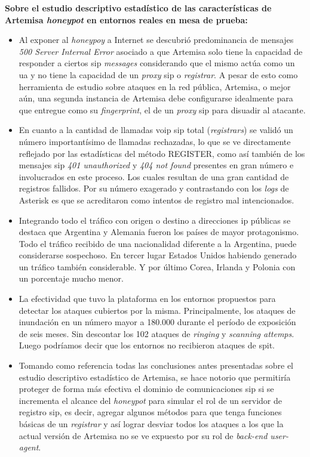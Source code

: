 \documentclass[a4paper,12pt]{report}
\begin{document}
\textbf{Sobre el estudio descriptivo estadístico de las características de Artemisa
\emph{honeypot} en entornos reales en mesa de prueba:}

\begin{itemize}
\item{Al exponer al \emph{honeypoy} a Internet se descubrió predominancia de mensajes 
\emph{500 Server Internal Error} asociado a que Artemisa solo tiene la capacidad de responder
a ciertos \ac{sip} \emph{messages} considerando que el mismo actúa como un \ac{ua} y no tiene la
capacidad de un \emph{proxy} \ac{sip} o \emph{registrar}. A pesar de esto como herramienta
de estudio sobre ataques en la red pública,  Artemisa, o mejor aún, una 
segunda instancia de Artemisa debe configurarse idealmente para que entregue como su \emph{fingerprint},
el de un \emph{proxy} \ac{sip} para disuadir al atacante.}

\item{En cuanto a la cantidad de llamadas \ac{voip} \ac{sip} total (\emph{registrars})
se validó un número importantísimo de llamadas rechazadas, lo que se ve directamente
reflejado por las estadísticas del método REGISTER, como así también de los mensajes \ac{sip}
\emph{401 unauthorized} y \emph{404 not found} presentes en gran número e involucrados en este proceso. 
Los cuales resultan de una gran cantidad de registros fallidos. Por su número exagerado y \mbox{contrastando}
con los \emph{logs} de Asterisk es que se acreditaron como intentos de
registro mal intencionados.}

\item{Integrando todo el tráfico con origen o destino a direcciones \ac{ip} públicas
se destaca que Argentina y Alemania fueron los países de mayor protagonismo. 
Todo el tráfico recibido de una nacionalidad diferente a la Argentina, puede considerarse sospechoso.
En tercer lugar Estados Unidos habiendo generado un tráfico también
considerable. Y por último Corea, Irlanda y Polonia con un porcentaje mucho
menor.}

\item{La efectividad que tuvo la plataforma en los entornos propuestos 
para detectar los ataques cubiertos por la misma. Principalmente, los ataques de inundación 
en un número mayor a 180.000 durante el período de exposición de seis meses. Sin descontar 
los 102 ataques de \emph{ringing} y \emph{scanning attemps}. Luego podríamos decir que los entornos no 
recibieron ataques de \ac{spit}.}

\item{Tomando como referencia todas las conclusiones antes presentadas sobre el estudio 
descriptivo estadístico de Artemisa, se hace notorio que permitiría proteger de forma más efectiva
el dominio de comunicaciones \ac{sip} si se incrementa el alcance del
\emph{honeypot} para simular el rol de un servidor de registro \ac{sip}, es decir, agregar algunos
métodos para que tenga funciones básicas de un \emph{registrar} y así lograr desviar todos los ataques
a los que la actual versión de Artemisa no se ve expuesto por su rol de \emph{back-end user-agent}.}
\end{itemize}
\end{document}
